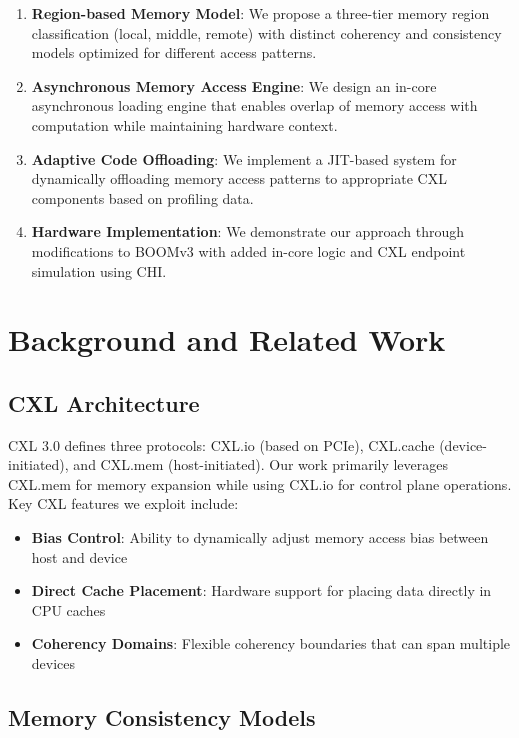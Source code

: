 \documentclass[10pt,conference]{IEEEtran}
\begin{document}
\begin{enumerate}
    \item \textbf{Region-based Memory Model}: We propose a three-tier memory region classification (local, middle, remote) with distinct coherency and consistency models optimized for different access patterns.
    
    \item \textbf{Asynchronous Memory Access Engine}: We design an in-core asynchronous loading engine that enables overlap of memory access with computation while maintaining hardware context.
    
    \item \textbf{Adaptive Code Offloading}: We implement a JIT-based system for dynamically offloading memory access patterns to appropriate CXL components based on profiling data.
    
    \item \textbf{Hardware Implementation}: We demonstrate our approach through modifications to BOOMv3 with added in-core logic and CXL endpoint simulation using CHI.
\end{enumerate}

\section{Background and Related Work}

\subsection{CXL Architecture}

CXL 3.0 defines three protocols: CXL.io (based on PCIe), CXL.cache (device-initiated), and CXL.mem (host-initiated). Our work primarily leverages CXL.mem for memory expansion while using CXL.io for control plane operations. Key CXL features we exploit include:

\begin{itemize}
    \item \textbf{Bias Control}: Ability to dynamically adjust memory access bias between host and device
    \item \textbf{Direct Cache Placement}: Hardware support for placing data directly in CPU caches
    \item \textbf{Coherency Domains}: Flexible coherency boundaries that can span multiple devices
\end{itemize}

\subsection{Memory Consistency Models}
\end{document}
